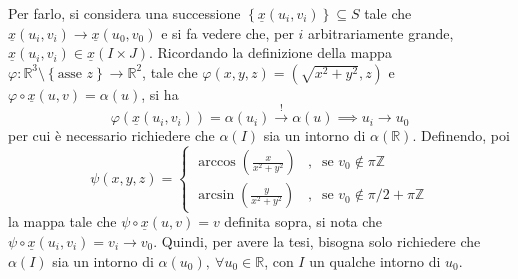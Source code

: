 \documentclass[12pt]{scrartcl}
\theoremstyle{style}
\numberwithin{equation}{subsection}
\begin{document}
Per farlo, si considera una successione $\left\{ \underline{x}(u_i,v_i) \right\} \subseteq S$ tale che $\underline{x}(u_i,v_i)\to \underline{x}(u_0,v_0)$ e si fa vedere che, per $i$ arbitrariamente grande, $\underline{x}(u_i,v_i) \in \underline{x}(I \times J)$.
Ricordando la definizione della mappa $\varphi : \mathbb{R}^3 \setminus\left\{ \text{asse }z \right\}\to \mathbb{R}^2 $, tale che $\varphi (x,y,z) = (\sqrt{x^2 + y^2} ,z)$ e $\varphi \circ \underline{x}(u,v) = \alpha (u)$, si ha
\[
	\varphi (\underline{x}(u_i,v_i)) = \alpha (u_i) \stackrel{!}{\to} \alpha (u) \implies u_i \to u_0
\] 
per cui \`e necessario richiedere che $\alpha (I)$ sia un intorno di $\alpha (\mathbb{R})$.
Definendo, poi
\[
\psi (x,y,z) = \begin{cases}
	\arccos \left(\displaystyle \frac{x}{x^2 + y^2}\right) &,\ \text{ se } v_0 \not\in \pi\mathbb{Z}\\
	\arcsin \left(\displaystyle \frac{y}{x^2 + y^2}\right) &,\ \text{ se } v_0 \not\in \pi / 2 + \pi\mathbb{Z}
\end{cases}
\] 
la mappa tale che $\psi \circ \underline{x}(u,v) = v$ definita sopra, si nota che $\psi \circ \underline{x}(u_i,v_i) = v_i \to v_0$.
Quindi, per avere la tesi, bisogna solo richiedere che $\alpha(I)$ sia un intorno di $\alpha (u_0), \ \forall u_0\in \mathbb{R}$, con $I$ un qualche intorno di $u_0$.
\end{document}
